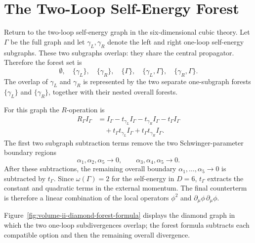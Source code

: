 \section{The Two-Loop Self-Energy Forest}

Return to the two-loop self-energy graph in the six-dimensional cubic theory.
Let \(\Gamma\) be the full graph and let \(\gamma_L,\gamma_R\) denote the left
and right one-loop self-energy subgraphs.  These two subgraphs overlap: they
share the central propagator.  Therefore the forest set is
\[
  \emptyset,\quad
  \{\gamma_L\},\quad
  \{\gamma_R\},\quad
  \{\Gamma\},\quad
  \{\gamma_L,\Gamma\},\quad
  \{\gamma_R,\Gamma\}.
\]
The overlap of \(\gamma_L\) and \(\gamma_R\) is represented by the two separate
one-subgraph forests \(\{\gamma_L\}\) and \(\{\gamma_R\}\), together with their
nested overall forests.

For this graph the \(R\)-operation is
\[
\begin{aligned}
  R_\Gamma I_\Gamma
  &=
  I_\Gamma
  -t_{\gamma_L}I_\Gamma
  -t_{\gamma_R}I_\Gamma
  -t_\Gamma I_\Gamma        \\
  &\quad
  +t_\Gamma t_{\gamma_L}I_\Gamma
  +t_\Gamma t_{\gamma_R}I_\Gamma .
\end{aligned}
\]
The first two subgraph subtraction terms remove the two Schwinger-parameter
boundary regions
\[
  \alpha_1,\alpha_2,\alpha_5\to0,
  \qquad
  \alpha_3,\alpha_4,\alpha_5\to0 .
\]
After these subtractions, the remaining overall boundary
\(\alpha_1,\ldots,\alpha_5\to0\) is subtracted by \(t_\Gamma\).  Since
\(\omega(\Gamma)=2\) for the self-energy in \(D=6\), \(t_\Gamma\) extracts the
constant and quadratic terms in the external momentum.  The final counterterm
is therefore a linear combination of the local operators \(\phi^2\) and
\(\partial_\mu\phi\,\partial_\mu\phi\).

Figure~\ref{fig:volume-ii-diamond-forest-formula} displays the diamond graph in
which the two one-loop subdivergences overlap; the forest formula subtracts
each compatible option and then the remaining overall divergence.

